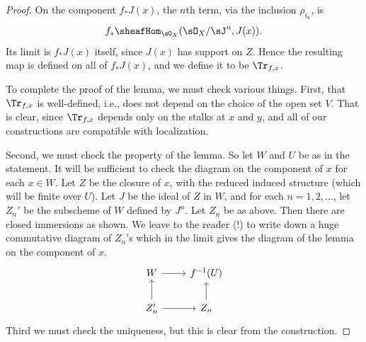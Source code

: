 \begin{proof}
On the component $f_*J(x)$, the $n$th term, via the inclusion $\rho_{i_n}$, is
\[
f_*\sheafHom_{\sO_X}(\sO_X/\sJ^n,J(x)).
\]
Its limit is $f_*J(x)$ itself, since $J(x)$ has support on $Z$. Hence the resulting map is defined on all of $f_*J(x)$, and we define it to be $\Tr_{f,x}$.


To complete the proof of the lemma, we must check various things. First, that $\Tr_{f,x}$ is well-defined, i.e., does not depend on the choice of the open set $V$. That is clear, since $\Tr_{f,x}$ depends only on the stalks at $x$ and $y$, and all of our constructions are compatible with localization.

Second, we must check the property of the lemma. So let $W$ and $U$ be as in the statement. It will be sufficient to check the diagram on the component of $x$ for each $x\in W$. Let $Z$ be the closure of $x$, with the reduced induced structure (which will be finite over $U$). Let $J$ be the ideal of $Z$ in $W$, and for each $n=1,2,\ldots$, let $Z_n'$ be the subscheme of $W$ defined by $J^{n}$. Let $Z_n$ be as above. Then there are closed immersions as shown. We leave to the reader (!) to write down a huge commutative diagram of $Z_n$'s which in the limit gives the diagram of the lemma on the component of $x$.
\[\begin{tikzcd}
	W\ar[r]&f^{-1}(U)\\
	Z'_n\ar[r]\ar[u]&Z_n\ar[u]
\end{tikzcd}\]
Third we must check the uniqueness, but this is clear from the construction.
\end{proof}

